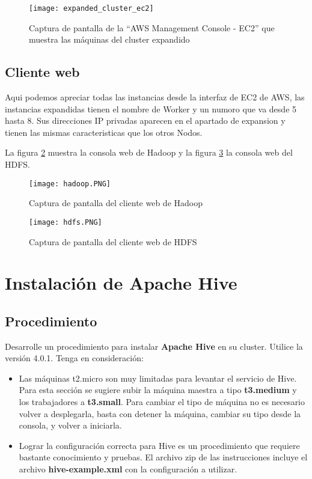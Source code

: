 \documentclass[9pt,letterpaper,twoside]{article}
\begin{document}
\begin{figure}
    \centering
    \texttt{[image: expanded\_cluster\_ec2]}
    \caption{Captura de pantalla de la ``AWS Management Console - EC2'' que muestra las máquinas del cluster expandido}
    \label{expanded_cluster_ec2}
\end{figure}

\subsection{Cliente web}

Aqui podemos apreciar todas las instancias desde la interfaz de EC2 de AWS, las instancias expandidas tienen el nombre de Worker
y un numoro que va desde 5 hasta 8. Sus direcciones IP privadas aparecen en el apartado de expansion y tienen las mismas
caracteristicas que los otros Nodos.


La figura \ref{hadoop.PNG} muestra la consola web de Hadoop y la figura \ref{hdfs.PNG} la consola web del HDFS.

\begin{figure}
    \centering
    \texttt{[image: hadoop.PNG]}
    \caption{Captura de pantalla del cliente web de Hadoop}
    \label{hadoop.PNG}
\end{figure}

\begin{figure}
    \centering
    \texttt{[image: hdfs.PNG]}
    \caption{Captura de pantalla del cliente web de HDFS}
    \label{hdfs.PNG}
\end{figure}

\section{Instalación de Apache Hive}

\subsection{Procedimiento}

{\color{red} Desarrolle un procedimiento para instalar \textbf{Apache Hive} en su cluster. Utilice la versión 4.0.1. Tenga en consideración:
\begin{itemize}
    \item Las máquinas t2.micro son muy limitadas para levantar el servicio de Hive. Para esta sección se sugiere subir la máquina maestra a tipo \textbf{t3.medium} y los trabajadores a \textbf{t3.small}. Para cambiar el tipo de máquina no es necesario volver a desplegarla, basta con detener la máquina, cambiar su tipo desde la consola, y volver a iniciarla.
    \item Lograr la configuración correcta para Hive es un procedimiento que requiere bastante conocimiento y pruebas. El archivo zip de las instrucciones incluye el archivo \textbf{hive-example.xml} con la configuración a utilizar.
\end{itemize}}
\end{document}
